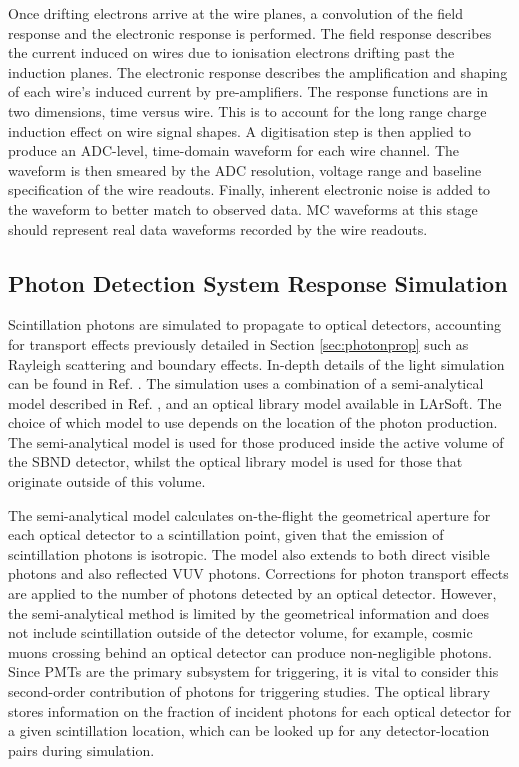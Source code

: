 Once drifting electrons arrive at the wire planes, a convolution of the field response and the electronic response is performed.                                                                                                          
The field response describes the current induced on wires due to ionisation electrons drifting past the induction planes.                                                                                                           
The electronic response describes the amplification and shaping of each wire's induced current by pre-amplifiers.
The response functions are in two dimensions, time versus wire.
This is to account for the long range charge induction effect on wire signal shapes.
A digitisation step is then applied to produce an ADC-level, time-domain waveform for each wire channel.
The waveform is then smeared by the ADC resolution, voltage range and baseline specification of the wire readouts.
Finally, inherent electronic noise is added to the waveform to better match to observed data.
MC waveforms at this stage should represent real data waveforms recorded by the wire readouts.

\subsection{Photon Detection System Response Simulation}
\label{sec:pds_response}

Scintillation photons are simulated to propagate to optical detectors, accounting for transport effects previously detailed in Section \ref{sec:photonprop} such as Rayleigh scattering and boundary effects.
In-depth details of the light simulation can be found in Ref. \cite{sbnd_pds_paper}.
The simulation uses a combination of a semi-analytical model described in Ref. \cite{pds_sim}, and an optical library model available in LArSoft.
The choice of which model to use depends on the location of the photon production.
The semi-analytical model is used for those produced inside the active volume of the SBND detector, whilst the optical library model is used for those that originate outside of this volume.

The semi-analytical model calculates on-the-flight the geometrical aperture for each optical detector to a scintillation point, given that the emission of scintillation photons is isotropic.
The model also extends to both direct visible photons and also reflected VUV photons. 
Corrections for photon transport effects are applied to the number of photons detected by an optical detector.
However, the semi-analytical method is limited by the geometrical information and does not include scintillation outside of the detector volume, for example, cosmic muons crossing behind an optical detector can produce non-negligible photons.
Since PMTs are the primary subsystem for triggering, it is vital to consider this second-order contribution of photons for triggering studies.
The optical library stores information on the fraction of incident photons for each optical detector for a given scintillation location, which can be looked up for any detector-location pairs during 
simulation. 


